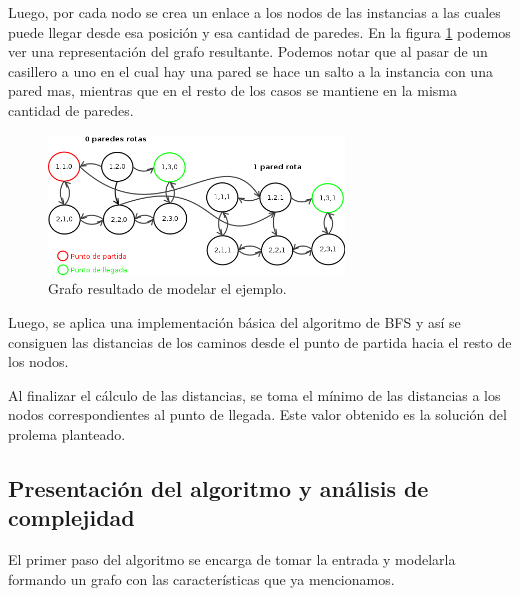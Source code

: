\par Luego, por cada nodo se crea un enlace a los nodos de las instancias a las cuales puede llegar desde esa posición y esa cantidad de paredes. En la figura \ref{fig: ejemplo_grafo_inicial} podemos ver una representación del grafo resultante. Podemos notar que al pasar de un casillero a uno en el cual hay una pared se hace un salto a la instancia con una pared mas, mientras que en el resto de los casos se mantiene en la misma cantidad de paredes.

\begin{figure}[h]
	\begin{center}
		\includegraphics[width=0.7\textwidth]{Problema1/img/ejemplo_grafo_inicial.png}
		\caption{Grafo resultado de modelar el ejemplo.}
		\label{fig: ejemplo_grafo_inicial}
	\end{center}
\end{figure}

\par Luego, se aplica una implementación básica del algoritmo de BFS y así se consiguen las distancias de los caminos desde el punto de partida hacia el resto de los nodos.

\par Al finalizar el cálculo de las distancias, se toma el mínimo de las distancias a los nodos correspondientes al punto de llegada. Este valor obtenido es la solución del prolema planteado.

\subsection{Presentación del algoritmo y análisis de complejidad}

\par El primer paso del algoritmo se encarga de tomar la entrada y modelarla formando un grafo con las características que ya mencionamos.

